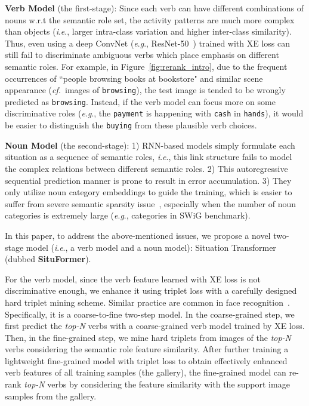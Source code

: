 \documentclass[letterpaper]{article} \usepackage{aaai22}  \usepackage{times}  \usepackage{helvet}  \usepackage{courier}  \usepackage[hyphens]{url}  \usepackage{graphicx} \urlstyle{rm} \def\UrlFont{\rm}  \usepackage{natbib}  \usepackage{caption} \DeclareCaptionStyle{ruled}{labelfont=normalfont,labelsep=colon,strut=off} \frenchspacing  \setlength{\pdfpagewidth}{8.5in}  \setlength{\pdfpageheight}{11in}
\newcommand{\ie}{\textit{i}.\textit{e}.}
\newcommand{\eg}{\textit{e}.\textit{g}.}
\newcommand{\cf}{\textit{cf.}}
\begin{document}
\noindent\textbf{Verb Model} (the first-stage): Since each verb can have different combinations of nouns w.r.t the semantic role set, the activity patterns are much more complex than objects (\ie, larger intra-class variation and higher inter-class similarity). Thus, even using a deep ConvNet  (\eg, ResNet-50~\cite{he2016deep}) trained with XE loss can still fail to discriminate ambiguous verbs which place emphasis on different semantic roles. For example, in Figure~\ref{fig:rerank_intro}, due to the frequent occurrences of ``people browsing books at bookstore" and similar scene appearance (\cf~images of \texttt{browsing}), the test image is tended to be wrongly predicted as \texttt{browsing}. Instead, if the verb model can focus more on some discriminative roles (\eg, the \texttt{payment} is happening with \texttt{cash} in \texttt{hands}), it would be easier to distinguish the \texttt{buying} from these plausible verb choices.




















\noindent\textbf{Noun Model} (the second-stage): 1) RNN-based models simply formulate each situation as a sequence of semantic roles, \ie, this link structure fails to model the complex relations between different semantic roles. 2) This autoregressive sequential prediction manner is prone to result in error accumulation. 3) They only utilize noun category embeddings to guide the training, which is easier to suffer from severe semantic sparsity issue~\cite{yatskar2017commonly}, especially when the number of noun categories is extremely large (\eg,   categories in SWiG benchmark).


In this paper, to address the above-mentioned issues, we propose a novel two-stage model (\ie, a verb model and a noun model): Situation Transformer (dubbed \textbf{SituFormer}).

For the verb model, since the verb feature learned with XE loss is not discriminative enough, we enhance it using triplet loss with a carefully designed hard triplet mining scheme. Similar practice are common in face recognition~\cite{schroff2015facenet,wen2016discriminative}. Specifically, it is a coarse-to-fine two-step model. In the coarse-grained step, we first predict the \emph{top-N} verbs with a coarse-grained verb model trained by XE loss. Then, in the fine-grained step, we mine hard triplets from images of the \emph{top-N} verbs considering the semantic role feature similarity. After further training a lightweight fine-grained model with triplet loss to obtain effectively enhanced verb features of all training samples (the gallery), the fine-grained model can re-rank \emph{top-N} verbs by considering the feature similarity with the support image samples from the gallery.
\end{document}
